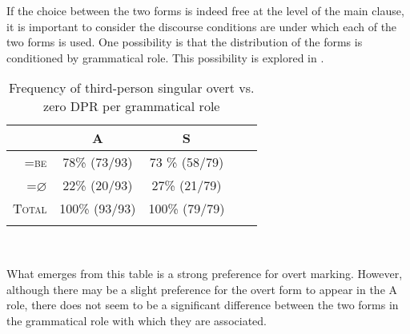 If the choice between the two forms is indeed free at the level of the main clause, it is important to consider the discourse conditions are under which each of the two forms is used. One possibility is that the distribution of the forms is conditioned by grammatical role. This possibility is explored in .
\begin{table}

\caption{{Frequency of third-person singular overt vs. zero DPR per grammatical role}}
\begin{tabular}{| r  c  c  c  c }
\lsptoprule
 & A & S \\

\midrule
\textsc{=be} &  78{\%} (73/93) & 73 {\%} (58/79) \\

\midrule
\textsc{=$\varnothing$} &  22{\%} (20/93)  &  27{\%} (21/79) \\

\midrule
\textsc{Total} &  100{\%} (93/93) &  100{\%} (79/79)  \\

\lspbottomrule
\end{tabular}\\
\label{overtvszero}

\end{table}
What emerges from this table is a strong preference for overt marking. However, although there may be a slight preference for the overt form to appear in the A role, there does not seem to be a significant difference between the two forms in the grammatical role with which they are associated.

